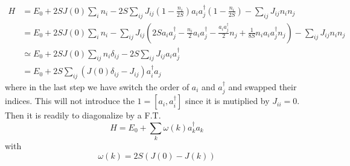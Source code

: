 \documentclass[11pt]{article}
\theoremstyle{remark}
\theoremstyle{definition}
\numberwithin{thm}{section}
\numberwithin{equation}{section}
\begin{document}
\begin{equation}
	\begin{split}
		H &= E_0 + 2SJ(0)\sum_{i}n_i - 2S\sum_{ij}J_{ij}\left(1 - \frac{n_i}{2S}\right) a_i a_j^\dagger\left(1 - \frac{n_i}{2S}\right) - \sum_{ij}J_{ij}n_i n_j \\
		  &= E_0 + 2SJ(0)\sum_{i}n_i - \sum_{ij}J_{ij}\left( 2S a_i a_j^\dagger - \frac{n_i}{2}a_i a_j^\dagger - \frac{a_i a_j^\dagger}{2} n_j + \frac{1}{8S}n_ia_i a_j^\dagger n_j \right)  - \sum_{ij}J_{ij}n_i n_j \\
		  &\simeq E_0 + 2SJ(0)\sum_{ij}n_i\delta_{ij} - 2S\sum_{ij}J_{ij}a_i a_j^\dagger\\
		  &= E_0 + 2S \sum_{ij}\left( J(0)\delta_{ij} - J_{ij} \right) a_i^\dagger a_j
	\end{split}
\end{equation}
where in the last step we have switch the order of $a_i$ and $a_j^\dagger$ and swapped their indices. This will not introduce the $1 = [a_i, a_i^\dagger]$ since it is mutiplied by $J_{ii} = 0$. Then it is readily to diagonalize by a F.T.
\begin{equation}
	H = E_0 + \sum_{k}\omega(k) a_k^\dagger a_k 
\end{equation}
with
\begin{equation}
	\omega(k) = 2S\left(J(0) - J(k)\right)
\end{equation}



%
\end{document}
